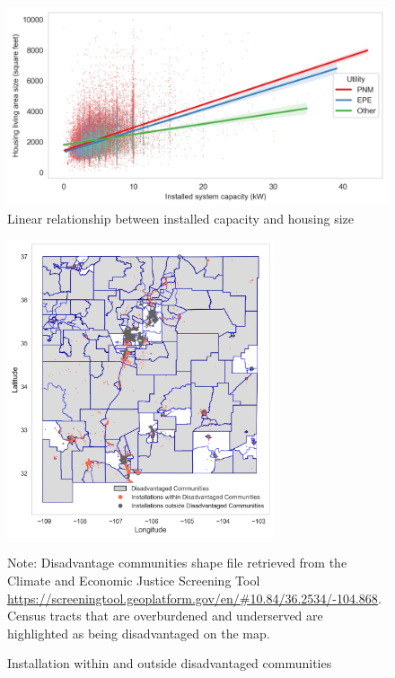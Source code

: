 \documentclass[12pt,twoside,letterpaper]{article}
\begin{document}
\begin{figure}[!ht]
    \centering
\includegraphics[width=1\textwidth]{figures/capacity_house_size.png}
    \caption{Linear relationship between installed capacity and housing size}
    \label{fig:capacity_size}
\end{figure}


\begin{figure}[!ht]
    \centering
\includegraphics[width=0.7\textwidth]{figures/disadvantage_installation.png}
    \caption{Installation within and outside disadvantaged communities}
    \label{fig:disadvantage_installation}
        \begin{flushleft}
        \footnotesize Note: Disadvantage communities shape file retrieved from the Climate and Economic Justice Screening Tool \url{https://screeningtool.geoplatform.gov/en/#10.84/36.2534/-104.868}. Census tracts that are overburdened and underserved are highlighted as being disadvantaged on the map.
    \end{flushleft}
\end{figure}
\end{document}
